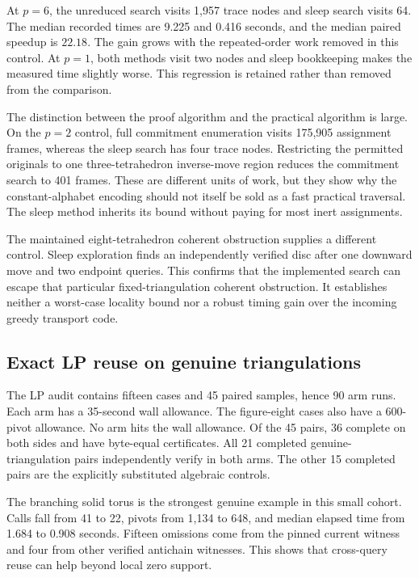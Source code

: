 

At $p=6$, the unreduced search visits 1,957 trace nodes and sleep search
visits 64. The median recorded times are 9.225 and 0.416 seconds, and the
median paired speedup is $22.18$. The gain grows with the repeated-order
work removed in this control. At $p=1$, both methods visit two nodes and
sleep bookkeeping makes the measured time slightly worse. This regression
is retained rather than removed from the comparison.

The distinction between the proof algorithm and the practical algorithm is
large. On the $p=2$ control, full commitment enumeration visits 175,905
assignment frames, whereas the sleep search has four trace nodes. Restricting
the permitted originals to one three-tetrahedron inverse-move region reduces
the commitment search to 401 frames. These are different units of work, but
they show why the constant-alphabet encoding should not itself be sold as a
fast practical traversal. The sleep method inherits its bound without paying
for most inert assignments.

The maintained eight-tetrahedron coherent obstruction supplies a different
control. Sleep exploration finds an independently verified disc after one
downward move and two endpoint queries. This confirms that the implemented
search can escape that particular fixed-triangulation coherent obstruction.
It establishes neither a worst-case locality bound nor a robust timing gain
over the incoming greedy transport code.

\subsection{Exact LP reuse on genuine triangulations}

The LP audit contains fifteen cases and 45 paired samples, hence 90 arm
runs. Each arm has a 35-second wall allowance. The figure-eight cases also
have a 600-pivot allowance. No arm hits the wall allowance. Of the 45 pairs,
36 complete on both sides and have byte-equal certificates. All 21 completed
genuine-triangulation pairs independently verify in both arms. The other
15 completed pairs are the explicitly substituted algebraic controls.



The branching solid torus is the strongest genuine example in this small
cohort. Calls fall from 41 to 22, pivots from 1,134 to 648, and median elapsed
time from 1.684 to 0.908 seconds. Fifteen omissions come from the pinned
current witness and four from other verified antichain witnesses. This shows
that cross-query reuse can help beyond local zero support.

